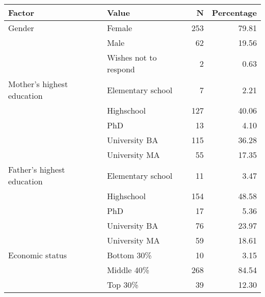 \begin{longtable}{llrr}
\toprule
\textbf{Factor} & \textbf{Value} & \textbf{N} & \textbf{Percentage} \\ 
\midrule\addlinespace[2.5pt]
Gender & Female & 253 & 79.81 \\ 
 & Male & 62 & 19.56 \\ 
 & Wishes not to respond & 2 & 0.63 \\ 
Mother's highest education & Elementary school & 7 & 2.21 \\ 
 & Highschool & 127 & 40.06 \\ 
 & PhD & 13 & 4.10 \\ 
 & University BA & 115 & 36.28 \\ 
 & University MA & 55 & 17.35 \\ 
Father's highest education & Elementary school & 11 & 3.47 \\ 
 & Highschool & 154 & 48.58 \\ 
 & PhD & 17 & 5.36 \\ 
 & University BA & 76 & 23.97 \\ 
 & University MA & 59 & 18.61 \\ 
Economic status & Bottom 30\% & 10 & 3.15 \\ 
 & Middle 40\% & 268 & 84.54 \\ 
 & Top 30\% & 39 & 12.30 \\ 
\bottomrule
\end{longtable}

